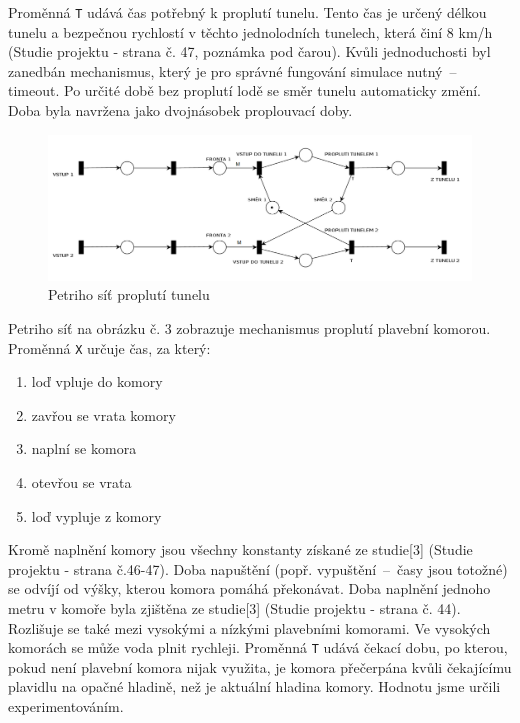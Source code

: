 \documentclass[11pt,a4paper]{article}
\begin{document}
      Proměnná \texttt{T} udává čas potřebný k proplutí tunelu.
      Tento čas je určený délkou tunelu a bezpečnou
      rychlostí v těchto jednolodních tunelech, která činí
      8 km/h (Studie projektu - strana č. 47, poznámka pod čarou).
      Kvůli jednoduchosti byl zanedbán mechanismus, který je pro správné
      fungování simulace nutný \,--\, timeout. Po určité době bez proplutí lodě
      se směr tunelu automaticky změní. Doba byla navržena jako dvojnásobek
      proplouvací doby.

      \begin{figure}[ht!]
        \centering
        \includegraphics[width=1\textwidth, natwidth=940, natheight=325]
                        {petri_net_1.png}
        \caption{Petriho síť proplutí tunelu \label{petri_1}}
      \end{figure}

      \break

      Petriho síť na obrázku č. 3 zobrazuje mechanismus proplutí plavební
      komorou. Proměnná \texttt{X} určuje čas, za který:

      \begin{enumerate}
        \item loď vpluje do komory
        \item zavřou se vrata komory
        \item naplní se komora
        \item otevřou se vrata
        \item loď vypluje z komory
      \end{enumerate}

      Kromě naplnění komory jsou všechny konstanty získané ze
      studie[3] (Studie projektu - strana č.46-47).
      Doba napuštění (popř. vypuštění \,--\, časy jsou totožné) se odvíjí od
      výšky, kterou komora pomáhá překonávat. Doba naplnění jednoho metru v
      komoře byla zjištěna ze studie[3] (Studie projektu - strana č. 44).
      Rozlišuje se také mezi vysokými a nízkými plavebními komorami.
      Ve vysokých komorách se může voda plnit rychleji.
      Proměnná \texttt{T} udává čekací dobu, po kterou, pokud není plavební
      komora nijak využita, je komora přečerpána kvůli čekajícímu plavidlu na
      opačné hladině, než je aktuální hladina komory. Hodnotu jsme určili
      experimentováním.
\end{document}
